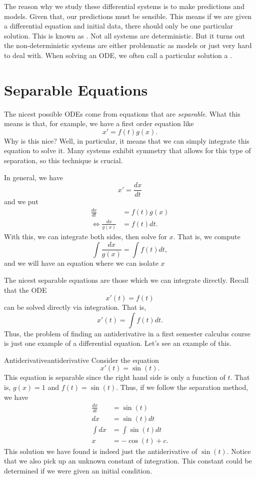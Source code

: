         The reason why we study these differential systems is to make predictions and models.  Given that, our predictions must be sensible. This means if we are given a differential equation and initial data, there should only be one particular solution.  This is known as .     Not all systems are deterministic.  But it turns out the non-deterministic systems are either problematic as models or just very hard to deal with. When solving an ODE, we often call a particular solution a .

        \section{Separable Equations}
        The nicest possible ODEs come from equations that are \emph{separable}.  What this means is that, for example, we have a first order equation like
        \[
        x'=f(t)g(x).
        \]
        Why is this nice? Well, in particular, it means that we can simply integrate this equation to solve it.  Many systems exhibit symmetry that allows for this type of separation, so this technique is crucial.

        In general, we have
        \[
        x'=\frac{dx}{dt}
        \]
        and we put
        \begin{align*}
            \frac{dx}{dt}&=f(t)g(x)\\
            \iff \frac{dx}{g(x)} &= f(t)dt.
        \end{align*}
        With this, we can integrate both sides, then solve for $x$. That is, we compute
        \[
        \int \frac{dx}{g(x)} = \int f(t)dt,
        \]
        and we will have an equation where we can isolate $x$

        The nicest separable equations are those which we can integrate directly.  Recall that the ODE
        \[
            x'(t) =f(t)
        \]
        can be solved directly via integration.  That is,
        \[
            x'(t) = \int f(t)dt.
        \]
        Thus, the problem of finding an antiderivative in a first semester calculus course is just one example of a differential equation.  Let's see an example of this.

\begin{ex}{Antiderivative}{antiderivative}
    Consider the equation
    \[
        x'(t) = \sin(t).
    \]
    This equation is separable since the right hand side is only a function of $t$. That is, $g(x)=1$ and $f(t)=\sin(t)$.  Thus, if we follow the separation method, we have
    \begin{align*}
        \frac{dx}{dt} &= \sin(t)\\
        dx &= \sin(t) dt\\
        \int dx &= \int \sin(t) dt\\
        x&= -\cos(t) + c.
    \end{align*}
    This solution we have found is indeed just the antiderivative of $\sin(t)$. Notice that we also pick up an unknown constant of integration. This constant could be determined if we were given an initial condition.
\end{ex}

